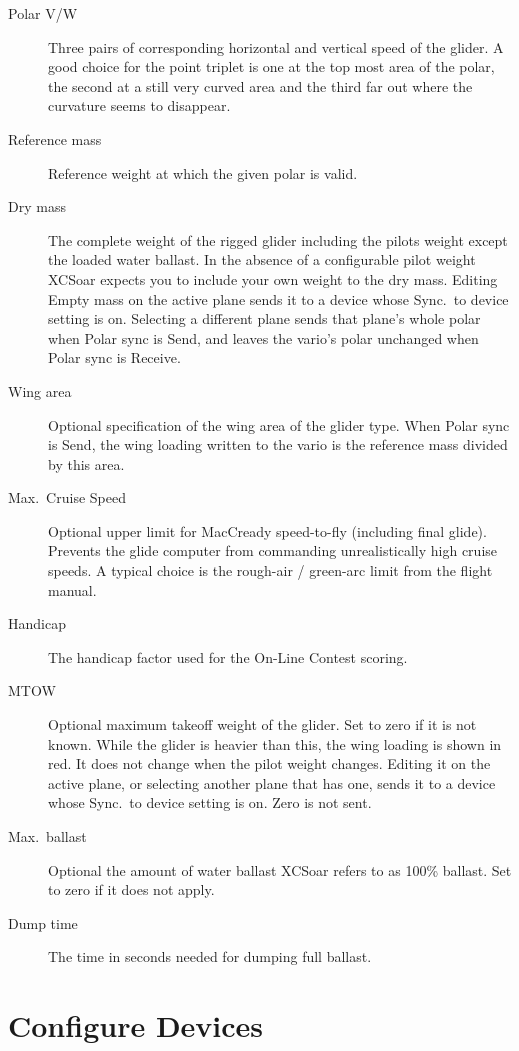 \begin{description}
\item[Polar V/W]  Three pairs of corresponding horizontal and vertical speed of the glider. 
  A good choice for the point triplet is one at the top most area of the polar, the second at a 
  still very curved area and the third far out where the curvature seems to disappear.
\item[Reference mass]  Reference weight at which the given polar is valid.
\item[Dry mass]  The complete weight of the rigged glider including the pilots weight except the 
  loaded water ballast. 
  In the absence of a configurable pilot weight XCSoar expects you to include your own weight
  to the dry mass.
  Editing Empty mass on the active plane sends it to a device whose
  Sync.\ to device setting is on.
  Selecting a different plane sends that plane's whole polar when
  Polar sync is Send, and leaves the vario's polar unchanged when
  Polar sync is Receive.
\item[Wing area]  Optional specification of the wing area of the glider type.
  When Polar sync is Send, the wing loading written to the vario is
  the reference mass divided by this area.
\item[Max.\ Cruise Speed] Optional upper limit for MacCready speed-to-fly
  (including final glide).  Prevents the glide computer from commanding
  unrealistically high cruise speeds.  A typical choice is the rough-air
  / green-arc limit from the flight manual.
\item[Handicap]  The handicap factor used for the On-Line Contest scoring.
\item[MTOW] Optional maximum takeoff weight of the glider. Set to zero
  if it is not known. While the glider is heavier than this, the wing
  loading is shown in red. It does not change when the pilot weight
  changes.
  Editing it on the active plane, or selecting another plane that has
  one, sends it to a device whose Sync.\ to device setting is on.
  Zero is not sent.
\item[Max.\ ballast]  Optional the amount of water ballast XCSoar refers to as 100\% ballast.
  Set to zero if it does not apply.
\item[Dump time]  The time in seconds needed for dumping full ballast.
\end{description}


\section{Configure Devices} \label{conf:comdevices}

